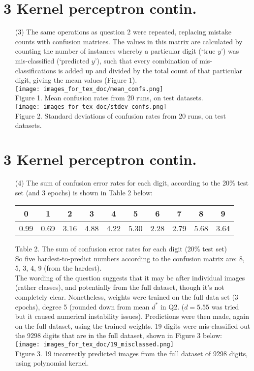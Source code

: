 \documentclass[a4paper,12pt]{article}
\begin{document}
\section*{3 Kernel perceptron contin.}
\begin{enumerate}

\item[(3)]
The same operations as question 2 were repeated, replacing mistake counts with confusion matrices. The values in this matrix are calculated by counting the number of instances whereby a particular digit (`true $y$') was mis-classified (`predicted $y$'), such that every combination of mis-classifications is added up and divided by the total count of that particular digit, giving the mean values (Figure 1). \\
\texttt{[image: images\_for\_tex\_doc/mean\_confs.png]}\\
Figure 1. Mean confusion rates from 20 runs, on test datasets. \\
\texttt{[image: images\_for\_tex\_doc/stdev\_confs.png]}\\
Figure 2. Standard deviations of confusion rates from 20 runs, on test datasets.\\
\end{enumerate}
\clearpage
\section*{3 Kernel perceptron contin.}
\begin{enumerate}
\item[(4)]
The sum of confusion error rates for each digit, according to the 20\% test set (and 3 epochs) is shown in Table 2 below:

\begin{tabular}{|c|c|c|c|c|c|c|c|c|c|}
\hline
0&1&2&3&4&5&6&7&8&9\\
\hline
0.99&0.69&3.16&4.88&4.22&5.30&2.28&2.79&5.68&3.64\\
\hline
\end{tabular}\par 
Table 2. The sum of confusion error rates for each digit (20\% test set)\\
So five hardest-to-predict numbers according to the confusion matrix are: 8, 5, 3, 4, 9 (from the hardest).\\
The wording of the question suggests that it may be after individual images (rather classes), and potentially from the full dataset, though it's not completely clear. Nonetheless, weights were trained on the full data set (3 epochs), degree 5 (rounded down from mean $d^*$ in Q2. ($d=5.55$ was tried but it caused numerical instability issues). Predictions were then made, again on the full dataset, using the trained weights. 19 digits were mis-classified out the 9298 digits that are in the full dataset, shown in Figure 3 below:\\
\texttt{[image: images\_for\_tex\_doc/19\_misclassed.png]}\\
Figure 3. 19 incorrectly predicted images from the full dataset of 9298 digits, using polynomial kernel.
\end{enumerate}
\clearpage
\end{document}
